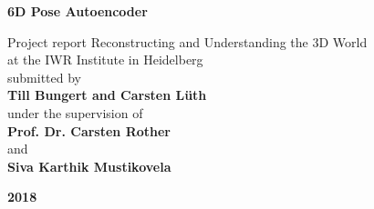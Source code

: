 \documentclass[10pt,a4paper]{article}
\begin{document}
  \pagestyle{empty}

  \begin{titlepage}


 \begin{center} 
	{\Large\textbf{ 
		6D Pose Autoencoder
	}}
    \vspace{1cm}
    
    Project report Reconstructing and Understanding the 3D World\\
    at the IWR Institute in Heidelberg\\
    \vspace{5cm}
    submitted by\\
    \vspace{0.5cm}
	{\large\textbf{Till Bungert and Carsten Lüth}\\}
	\vspace{5cm}
	under the supervision of \\
	\vspace{0.5cm}
	{\large\textbf{Prof. Dr. Carsten Rother}\\}
	and\\
	{\large\textbf{Siva Karthik Mustikovela}\\}


    \vspace{3cm}
	{\Large\textbf{2018}}
	

	

  \end{center}
\end{titlepage}


  \tableofcontents

\newpage

  \pagestyle{headings}
\end{document}
